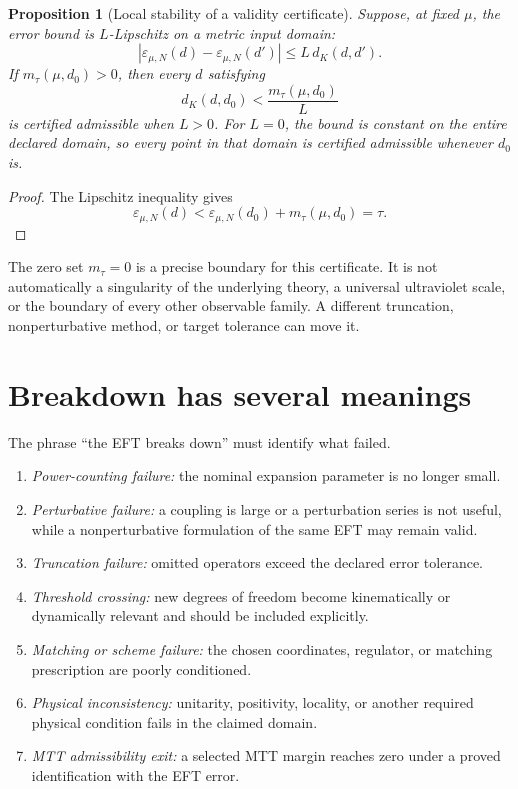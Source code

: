 \documentclass[11pt]{article}
\newtheorem{proposition}[theorem]{Proposition}
\theoremstyle{definition}
\theoremstyle{remark}
\begin{document}
\begin{proposition}[Local stability of a validity certificate]
\label{prop:validity}
Suppose, at fixed \(\mu\), the error bound is \(L\)-Lipschitz on a metric
input domain:
\[
 \left|\varepsilon_{\mu,N}(d)-\varepsilon_{\mu,N}(d')\right|
 \leq L\,d_K(d,d').
\]
If \(m_{\tau}(\mu,d_0)>0\), then every \(d\) satisfying
\[
 d_K(d,d_0)<\frac{m_{\tau}(\mu,d_0)}{L}
\]
 is certified admissible when \(L>0\).  For \(L=0\), the bound is constant on
 the entire declared domain, so every point in that domain is certified
 admissible whenever \(d_0\) is.
\end{proposition}

\begin{proof}
The Lipschitz inequality gives
\[
 \varepsilon_{\mu,N}(d)
 <
 \varepsilon_{\mu,N}(d_0)+m_{\tau}(\mu,d_0)
 =
 \tau.
\]
\end{proof}

The zero set \(m_\tau=0\) is a precise boundary for this certificate.  It is
not automatically a singularity of the underlying theory, a universal
ultraviolet scale, or the boundary of every other observable family.  A
different truncation, nonperturbative method, or target tolerance can move it.

\section{Breakdown has several meanings}

The phrase ``the EFT breaks down'' must identify what failed.

\begin{enumerate}[label=(B\arabic*)]
\item \emph{Power-counting failure:} the nominal expansion parameter is no
  longer small.
\item \emph{Perturbative failure:} a coupling is large or a perturbation
  series is not useful, while a nonperturbative formulation of the same EFT
  may remain valid.
\item \emph{Truncation failure:} omitted operators exceed the declared error
  tolerance.
\item \emph{Threshold crossing:} new degrees of freedom become kinematically
  or dynamically relevant and should be included explicitly.
\item \emph{Matching or scheme failure:} the chosen coordinates, regulator,
  or matching prescription are poorly conditioned.
\item \emph{Physical inconsistency:} unitarity, positivity, locality, or
  another required physical condition fails in the claimed domain.
\item \emph{MTT admissibility exit:} a selected MTT margin reaches zero under
  a proved identification with the EFT error.
\end{enumerate}
\end{document}
